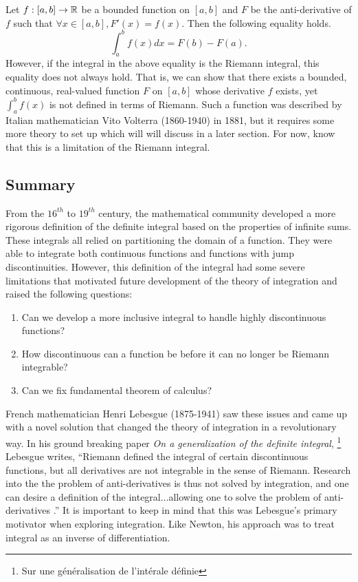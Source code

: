 \documentclass{article}
\theoremstyle{axiom} \newtheorem{axiom}{Axiom}
\theoremstyle{definition} \newtheorem{definition}{Definition}
\theoremstyle{example} \newtheorem{example}{Example}
\theoremstyle{proposition} \newtheorem{prop}{Proposition}
\theoremstyle{lemma} \newtheorem{lemma}{Lemma}
\begin{document}
Let $f:[a,b] \rightarrow \mathbb{R}$ be a  bounded function on $[a,b]$ and $F$ be the 
anti-derivative of $f$ such that $\forall x \in [a,b], F'(x) = f(x)$. Then the
following equality holds.
\begin{equation*}
	\int^{b}_{a} f(x) dx = F(b) - F(a).
\end{equation*}
However, if the integral in the above equality is the Riemann integral, 
this equality does not always hold. That is, we can show that there exists a 
bounded, continuous, real-valued function $F$ on $[a,b]$ whose derivative $f$ exists, 
yet $\int^{b}_{a}f(x)$ is not defined in terms of Riemann. Such a function was described by 
Italian mathematician Vito Volterra (1860-1940) in 1881, but it requires some 
more theory to set up which will will discuss in a later section. For now, know 
that this is a limitation of the Riemann integral.

\subsection{Summary}

From the $16^{th}$ to $19^{th}$ century, the mathematical community developed a 
more rigorous definition of the definite integral based on the properties of 
infinite sums. These integrals all relied on partitioning 
the domain of a function. They were able to integrate both continuous functions 
and functions with jump discontinuities. However, this definition of the
integral had some severe limitations that motivated future development of the 
theory of integration and raised the following questions:
\begin{enumerate}
	\item Can we develop a more inclusive integral to handle highly
		discontinuous functions?
	\item How discontinuous can a function be  before it can no longer be 
		Riemann integrable?
	\item Can we fix fundamental theorem of calculus?
\end{enumerate}
French mathematician Henri Lebesgue (1875-1941) saw these issues and 
came up with a novel solution that changed the theory of integration in a revolutionary way. In 
his ground breaking paper \textit{On a generalization of the definite integral},
\footnote{Sur une généralisation de l'intérale définie} Lebesgue writes,
``Riemann defined the integral of certain discontinuous functions, but all 
derivatives are not integrable in the sense of Riemann. Research into the
the problem of anti-derivatives is thus not solved by integration, and one can
desire a definition of the integral$\ldots$allowing one to solve the problem of
anti-derivatives \cite{lebesgue:1901}.'' It is important to keep in mind that 
this was Lebesgue's primary motivator when exploring integration. Like Newton, 
his approach was to treat integral as an inverse of differentiation.
\end{document}
